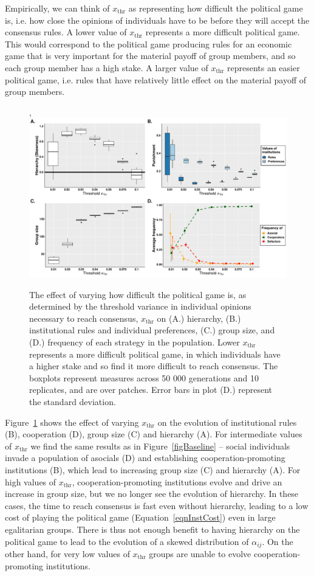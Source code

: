 \documentclass{rstb}
\begin{document}
\begin{linenumbers}
Empirically, we can think of $x_\mathrm{thr}$ as representing how difficult the political game is, i.e. how close the opinions of individuals have to be before they will accept the consensus rules. A lower value of $x_\mathrm{thr}$ represents a more difficult political game. This would correspond to the political game producing rules for an economic game that is very important for the material payoff of group members, and so each group member has a high stake. A larger value of $x_\mathrm{thr}$ represents an easier political game, i.e. rules that have relatively little effect on the material payoff of group members.

\begin{figure}, 
    \centering
    \includegraphics[width=0.8\linewidth]{Figures/pt_xThr.pdf}
    \caption{The effect of varying how difficult the political game is, as determined by the threshold variance in individual opinions necessary to reach consensus, $x_\mathrm{thr}$ on (A.) hierarchy, (B.) institutional rules and individual preferences, (C.) group size, and (D.) frequency of each strategy in the population. Lower $x_\mathrm{thr}$ represents a more difficult political game, in which individuals have a higher stake and so find it more difficult to reach consensus. The boxplots represent measures across 50 000 generations and 10 replicates, and are over patches. Error bars in plot (D.) represent the standard deviation.
    }
    \label{figXThr}
\end{figure}

Figure~\ref{figXThr} shows the effect of varying $x_\mathrm{thr}$ on the evolution of institutional rules (B), cooperation (D), group size (C) and hierarchy (A). For intermediate values of $x_\mathrm{thr}$ we find the same results as in Figure~\ref{figBaseline} -- social individuals invade a population of asocials (D) and establishing cooperation-promoting institutions (B), which lead to increasing group size (C) and hierarchy (A). For high values of $x_\mathrm{thr}$, cooperation-promoting institutions evolve and drive an increase in group size, but we no longer see the evolution of hierarchy. In these cases, the time to reach consensus is fast even without hierarchy, leading to a low cost of playing the political game (Equation~\ref{eqnInstCost}) even in large egalitarian groups. There is thus not enough benefit to having hierarchy on the political game to lead to the evolution of a skewed distribution of $\alpha_{ij}$. On the other hand, for very low values of $x_\mathrm{thr}$ groups are unable to evolve cooperation-promoting institutions.


\end{linenumbers}
\end{document}
